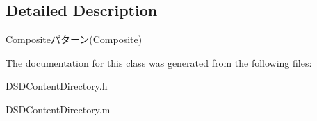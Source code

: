 \subsection{Detailed Description}
Compositeパターン(\-Composite) 

The documentation for this class was generated from the following files\-:\begin{DoxyCompactItemize}
\item 
D\-S\-D\-Content\-Directory.\-h\item 
D\-S\-D\-Content\-Directory.\-m\end{DoxyCompactItemize}
